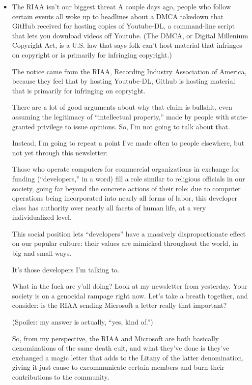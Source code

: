 \documentclass[11pt]{article}
\begin{document}
\begin{itemize}
\item The RIAA isn't our biggest threat
\label{sec:org4d67746}
A couple days ago, people who follow certain events all woke up to headlines about a DMCA takedown that GitHub received for hosting copies of Youtube-DL, a command-line script that lets you download videos off Youtube. (The DMCA, or Digital Millenium Copyright Act, is a U.S. law that says folk can’t host material that infringes on copyright or is primarily for infringing copyright.)

The notice came from the RIAA, Recording Industry Association of America, because they feel that by hosting Youtube-DL, Github is hosting material that is primarily for infringing on copryight.

There are a lot of good arguments about why that claim is bullshit, even assuming the legitimacy of “intellectual property,” made by people with state-granted privilege to issue opinions. So, I’m not going to talk about that.

Instead, I’m going to repeat a point I’ve made often to people elsewhere, but not yet through this newsletter:

Those who operate computers for commercial organizations in exchange for funding (“developers,” in a word) fill a role similar to religious officials in our society, going far beyond the concrete actions of their role: due to computer operations being incorporated into nearly all forms of labor, this developer class has authority over nearly all facets of human life, at a very individualized level.

This social position lets “developers” have a massively disproportionate effect on our popular culture: their values are mimicked throughout the world, in big and small ways.

It’s those developers I’m talking to.

What in the fuck are y’all doing? Look at my newsletter from yesterday. Your society is on a genocidal rampage right now. Let’s take a breath together, and consider: is the RIAA sending Microsoft a letter really that important?

(Spoiler: my answer is actually, “yes, kind of.”)

So, from my perspective, the RIAA and Microsoft are both basically denominations of the same death cult, and what they’ve done is they’ve exchanged a magic letter that adds to the Litany of the latter denomination, giving it just cause to excommunicate certain members and burn their contributions to the community.


\end{itemize}
\end{document}
